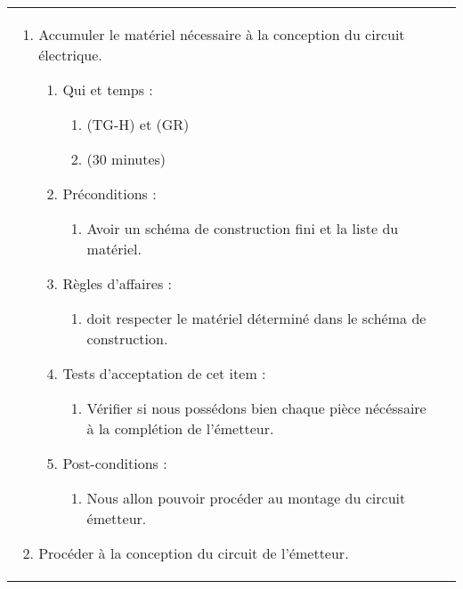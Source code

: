 \begin{longtable}{|l|p{}|}
\begin{enumerate}[label*=\arabic*.]
\begin{enumerate}[label*=\arabic*.]
\begin{enumerate}[label*=\arabic*.]
                    \end{enumerate}
                \end{enumerate}
            \item Accumuler le matériel nécessaire à la conception du circuit électrique.
            \begin{enumerate}[label*=\arabic*.]
                    \item Qui et temps :
                    \begin{enumerate}[label*=\arabic*.]
                        \item (TG-H) et (GR)
                        \item (30 minutes)
                    \end{enumerate}
                    \item Préconditions :
                    \begin{enumerate}[label*=\arabic*.]
                        \item Avoir un schéma de construction fini et la liste du matériel.
                    \end{enumerate}
                    \item Règles d’affaires :
                    \begin{enumerate}[label*=\arabic*.]
                        \item doit respecter le matériel déterminé dans le schéma de construction.
                    \end{enumerate}
                    \item Tests d'acceptation de cet item :
                    \begin{enumerate}[label*=\arabic*.]
                        \item Vérifier si nous possédons bien chaque pièce nécéssaire à la complétion de l'émetteur.
                    \end{enumerate}
                    \item Post-conditions :
                    \begin{enumerate}[label*=\arabic*.]
                        \item Nous allon pouvoir procéder au montage du circuit émetteur.
                    \end{enumerate}
                \end{enumerate}
            \item Procéder à la conception du circuit de l’émetteur.

\end{enumerate}
\end{longtable}
